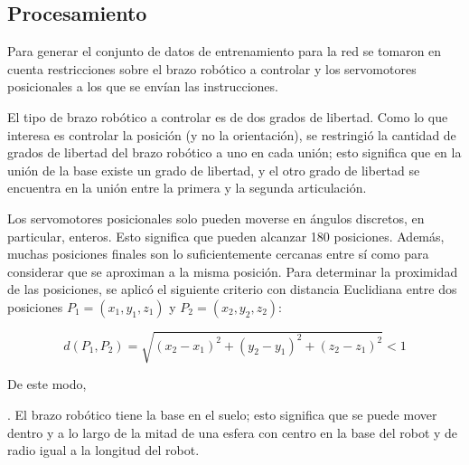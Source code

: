 \subsection{Procesamiento}

Para generar el conjunto de datos de entrenamiento para la red se tomaron en cuenta restricciones sobre el brazo robótico a controlar y los servomotores posicionales a los que se envían las instrucciones.

El tipo de brazo robótico a controlar es de dos grados de libertad. Como lo que interesa es controlar la posición (y no la orientación), se restringió la cantidad de grados de libertad del brazo robótico a uno en cada unión; esto significa que en la unión de la base existe un grado de libertad, y el otro grado de libertad se encuentra en la unión entre la primera y la segunda articulación. 

Los servomotores posicionales solo pueden moverse en ángulos discretos, en particular, enteros. Esto significa que pueden alcanzar 180 posiciones. Además, muchas posiciones finales son lo suficientemente cercanas entre sí como para considerar que se aproximan a la misma posición.  Para determinar la proximidad de las posiciones, se aplicó el siguiente criterio con distancia Euclidiana entre dos posiciones $P_1 = (x_1, y_1, z_1)$ y $P_2 = (x_2, y_2, z_2)$:

\begin{equation}
	d(P_1, P_2) = \sqrt{(x_2 - x_1)^2 + (y_2 - y_1)^2 + (z_2 - z_1)^2} < 1
	
\end{equation}

De este modo, 

. El brazo robótico tiene la base en el suelo; esto significa que se puede mover dentro y a lo largo de la mitad de una esfera con centro en la base del robot y de radio igual a la longitud del robot.